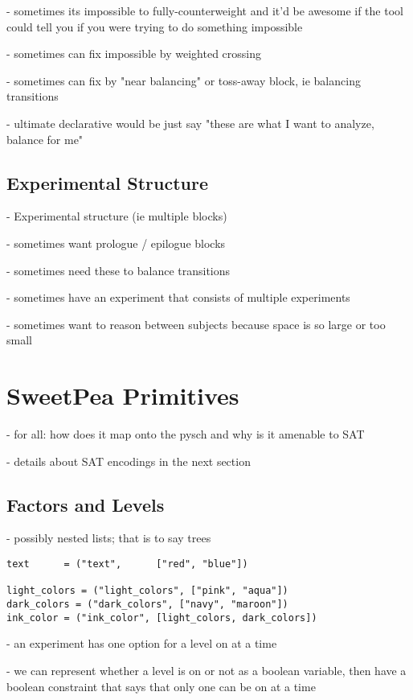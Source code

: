 - sometimes its impossible to fully-counterweight and it'd be awesome if the tool could tell you if you were trying to do something impossible

- sometimes can fix impossible by weighted crossing

- sometimes can fix by "near balancing" or toss-away block, ie balancing transitions

- ultimate declarative would be just say "these are what I want to analyze, balance for me"

\subsection{Experimental Structure}
- Experimental structure (ie multiple blocks)

- sometimes want prologue / epilogue blocks

- sometimes need these to balance transitions

- sometimes have an experiment that consists of multiple experiments

- sometimes want to reason between subjects because space is so large or too small



\section{SweetPea Primitives}

- for all: how does it map onto the pysch and why is it amenable to SAT

- details about SAT encodings in the next section

\subsection{Factors and Levels}
- possibly nested lists; that is to say trees

\begin{lstlisting}
text      = ("text",      ["red", "blue"])

light_colors = ("light_colors", ["pink", "aqua"])
dark_colors = ("dark_colors", ["navy", "maroon"])
ink_color = ("ink_color", [light_colors, dark_colors])
\end{lstlisting}

- an experiment has one option for a level on at a time

- we can represent whether a level is on or not as a boolean variable, then have a boolean constraint that says that only one can be on at a time

